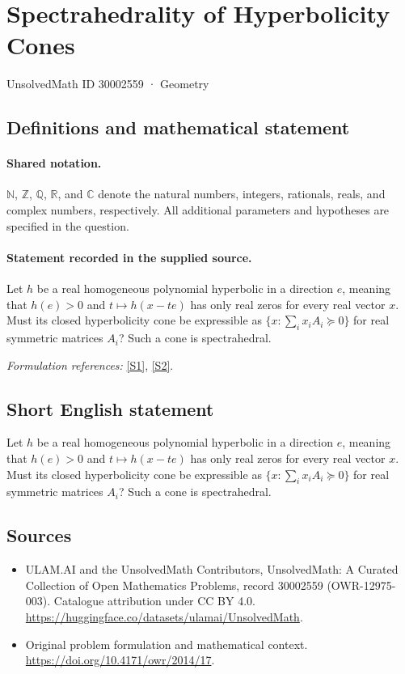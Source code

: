 \documentclass[11pt]{article}
\newcommand{\sref}[2]{\hyperlink{source:#1:#2}{[S#2]}}
\begin{document}
\setcounter{section}{30002558}
\section{Spectrahedrality of Hyperbolicity Cones}\label{30002559}
{\small UnsolvedMath ID 30002559 · Geometry}
\subsection{Definitions and mathematical statement}

\paragraph{Shared notation.}$\mathbb N$, $\mathbb Z$, $\mathbb Q$, $\mathbb R$, and $\mathbb C$ denote the natural numbers, integers, rationals, reals, and complex numbers, respectively. All additional parameters and hypotheses are specified in the question.


\paragraph{Statement recorded in the supplied source.}
Let $h$ be a real homogeneous polynomial hyperbolic in a direction $e$, meaning that $h(e)>0$ and $t\mapsto h(x-te)$ has only real zeros for every real vector $x$. Must its closed hyperbolicity cone be expressible as $\{x:\sum_i x_iA_i\succeq0\}$ for real symmetric matrices $A_i$? Such a cone is spectrahedral.
\par\smallskip\textit{Formulation references:} \sref{30002559}{1}, \sref{30002559}{2}.
\subsection{Short English statement}
Let $h$ be a real homogeneous polynomial hyperbolic in a direction $e$, meaning that $h(e)>0$ and $t\mapsto h(x-te)$ has only real zeros for every real vector $x$. Must its closed hyperbolicity cone be expressible as $\{x:\sum_i x_iA_i\succeq0\}$ for real symmetric matrices $A_i$? Such a cone is spectrahedral.
\subsection{Sources}
\begin{itemize}
\item[\hypertarget{source:30002559:1}{S1}] ULAM.AI and the UnsolvedMath Contributors, UnsolvedMath: A Curated Collection of Open Mathematics Problems, record 30002559 (OWR-12975-003). Catalogue attribution under CC BY 4.0.
\url{https://huggingface.co/datasets/ulamai/UnsolvedMath}.
\item[\hypertarget{source:30002559:2}{S2}] Original problem formulation and mathematical context.
\url{https://doi.org/10.4171/owr/2014/17}.
\end{itemize}
\label{end:30002559}
\end{document}
